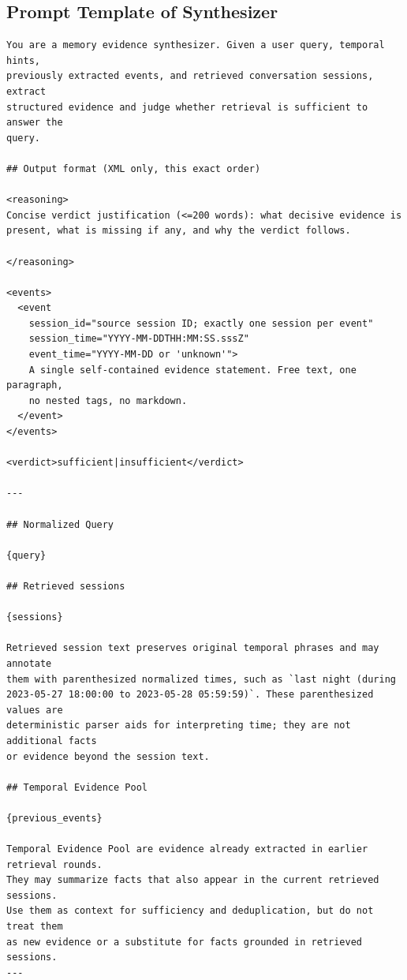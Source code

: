 
\subsection{Prompt Template of Synthesizer}
\label{app:synthesizer-prompt}

\begin{tcolorbox}[appendixexample,title={Prompt Template of Synthesizer: $P_{\mathrm{synth}}$}]
\begin{Verbatim}[fontsize=\scriptsize,formatcom=\linespread{0.82}\selectfont,breaklines=true,breakanywhere=true]
You are a memory evidence synthesizer. Given a user query, temporal hints,
previously extracted events, and retrieved conversation sessions, extract
structured evidence and judge whether retrieval is sufficient to answer the
query.

## Output format (XML only, this exact order)

<reasoning>
Concise verdict justification (<=200 words): what decisive evidence is
present, what is missing if any, and why the verdict follows.

</reasoning>

<events>
  <event
    session_id="source session ID; exactly one session per event"
    session_time="YYYY-MM-DDTHH:MM:SS.sssZ"
    event_time="YYYY-MM-DD or 'unknown'">
    A single self-contained evidence statement. Free text, one paragraph,
    no nested tags, no markdown.
  </event>
</events>

<verdict>sufficient|insufficient</verdict>

---

## Normalized Query

{query}

## Retrieved sessions

{sessions}

Retrieved session text preserves original temporal phrases and may annotate
them with parenthesized normalized times, such as `last night (during
2023-05-27 18:00:00 to 2023-05-28 05:59:59)`. These parenthesized values are
deterministic parser aids for interpreting time; they are not additional facts
or evidence beyond the session text.

## Temporal Evidence Pool

{previous_events}

Temporal Evidence Pool are evidence already extracted in earlier retrieval rounds.
They may summarize facts that also appear in the current retrieved sessions.
Use them as context for sufficiency and deduplication, but do not treat them
as new evidence or a substitute for facts grounded in retrieved sessions.
---


\end{Verbatim}
\end{tcolorbox}
